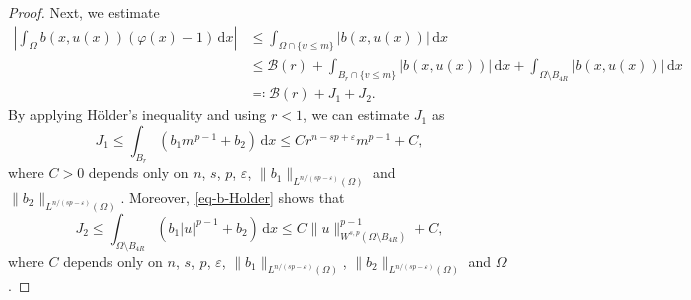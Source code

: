 \documentclass[11pt]{amsart}
\theoremstyle{plain}
\theoremstyle{definition}
\numberwithin{equation}{section}
\begin{document}
\begin{proof}
Next, we estimate
\begin{equation}\label{eq-upper-J12}
\begin{split}
    \left|\int_{\Omega} b(x, u(x))(\varphi(x)-1) \,\mathrm{d}x \right|
    &\leq \int_{\Omega \cap \{v \leq m\}} |b(x, u(x))| \,\mathrm{d}x \\
    &\leq \mathcal{B}(r) + \int_{B_r \cap \{v \leq m\}} |b(x, u(x))| \,\mathrm{d}x + \int_{\Omega \setminus B_{4R}} |b(x, u(x))| \,\mathrm{d}x \\
    &\eqqcolon \mathcal{B}(r) + J_1 + J_2.
\end{split}
\end{equation}
By applying H\"older's inequality and using $r<1$, we can estimate $J_1$ as
\begin{equation}\label{eq-upper-J1}
        J_1 \leq \int_{B_r} (b_1m^{p-1}+b_2)\,\mathrm{d}x\leq Cr^{n-sp+\varepsilon}m^{p-1}+C,
\end{equation}
where $C>0$ depends only on $n$, $s$, $p$, $\varepsilon$, $\|b_1\|_{L^{n/(sp-\varepsilon)}(\Omega)}$ and $\|b_2\|_{L^{n/(sp-\varepsilon)}(\Omega)}$. Moreover, \eqref{eq-b-Holder} shows that
\begin{equation}\label{eq-upper-J2}
J_2 \leq \int_{\Omega \setminus B_{4R}} (b_1|u|^{p-1}+b_2) \,\mathrm{d}x \leq C \|u\|_{W^{s, p}(\Omega \setminus B_{4R})}^{p-1} + C,
\end{equation}
where $C$ depends only on $n$, $s$, $p$, $\varepsilon$, $\|b_1\|_{L^{n/(sp-\varepsilon)}(\Omega)}$, $\|b_2\|_{L^{n/(sp-\varepsilon)}(\Omega)}$ and $\Omega$.


\end{proof}
\end{document}
